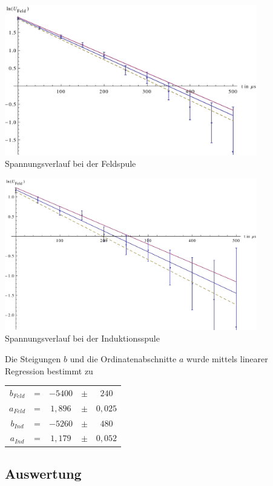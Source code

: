 \documentclass{article}
\begin{document}
\newpage
\begin{center}

  \includegraphics[width=11cm]{graphen/graph1}
	Spannungsverlauf bei der Feldspule

	\centering
  \includegraphics[width=11cm]{graphen/graph2}
	Spannungsverlauf bei der Induktionsspule
\end{center}

\noindent
Die Steigungen \(b\) und die Ordinatenabschnitte \(a\) wurde mittels linearer Regression bestimmt zu

\begin{center}
\begin{tabular}{c c c c c} 
  \(b_{Feld}\) & = & \(-5400\) & \(\pm \) & \(240 \) \\ 
  \(a_{Feld}\) & = & \(1,896\) & \(\pm \) & \(0,025 \) \\ 
  \(b_{Ind}\) & = & \(-5260\) & \(\pm \) & \(480 \) \\ 
  \(a_{Ind}\) & = & \(1,179\) & \(\pm \) & \(0,052 \) \\ 

 \end{tabular}
\end{center}

\subsection{Auswertung}
\end{document}
